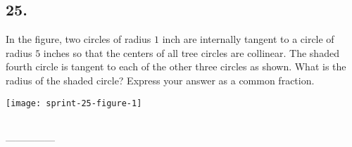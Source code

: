 \documentclass[12pt]{article}
\begin{document}
\begin{answer}
%
\end{answer}

\begin{answer}
\newpage
\end{answer}

\subsection*{25.}
In the figure, two circles of radius $1$ inch are internally tangent to a circle of radius $5$ inches so that the centers of all tree circles are collinear. The shaded fourth circle is tangent to each of the other three circles as shown. What is the radius of the shaded circle? Express your answer as a common fraction. 

\begin{minipagex}[b]{\linewidth}
\centering
\texttt{[image: sprint-25-figure-1]}
\end{minipagex}

\nopagebreak

\begin{minipage}[b]{\linewidth}
\fbox{\phantom{ANSWER}}\\
\mbox{---------------}\\
\fbox{\phantom{ANSWER}}
\end{minipage}
\end{document}
